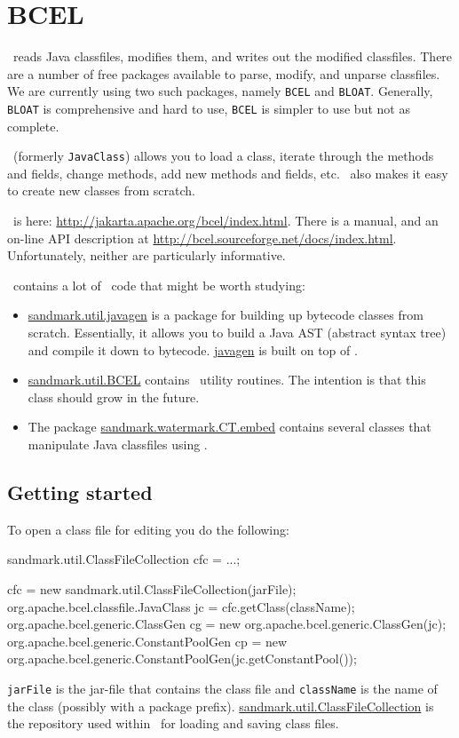 \section{BCEL}
\SM\ reads Java classfiles, modifies them, and
writes out the modified classfiles. There are
a number of free packages available to parse,
modify, and unparse classfiles. We are currently
using two such packages, namely {\tt BCEL} and
{\tt BLOAT}. Generally, {\tt BLOAT} is comprehensive
and hard to use, {\tt BCEL} is simpler to use but
not as complete.

\BCEL\ (formerly {\tt JavaClass}) allows you to load a class,
iterate through the methods and fields, change
methods, add new methods and fields, etc. \BCEL\
also makes it easy to create new classes from
scratch.

\BCEL\ is here:
\url{http://jakarta.apache.org/bcel/index.html}.
There is a manual, and an on-line API description
at \url{http://bcel.sourceforge.net/docs/index.html}.
Unfortunately, neither are particularly informative.

\SM\ contains a lot of \BCEL\ code that might be
worth studying:
\begin{itemize}
   \item \url{sandmark.util.javagen} is a package
         for building up bytecode classes from
         scratch. Essentially, it allows you to
         build a Java AST (abstract syntax tree)
         and compile it down to bytecode. \url{javagen}
         is built on top of \BCEL.
   \item \url{sandmark.util.BCEL} contains \BCEL\
         utility routines. The intention is that
         this class should grow in the future.
   \item The package \url{sandmark.watermark.CT.embed}
         contains several classes that manipulate 
         Java classfiles using \BCEL.
\end{itemize}

\subsection{Getting started}
To open a class file for editing you do the following:
\begin{listing}{1}
   sandmark.util.ClassFileCollection cfc = ...;

   cfc = new sandmark.util.ClassFileCollection(jarFile);
   org.apache.bcel.classfile.JavaClass jc = cfc.getClass(className);
   org.apache.bcel.generic.ClassGen cg = new org.apache.bcel.generic.ClassGen(jc);
   org.apache.bcel.generic.ConstantPoolGen cp = 
      new org.apache.bcel.generic.ConstantPoolGen(jc.getConstantPool());
\end{listing}
{\tt jarFile} is the jar-file that contains the class
file and {\tt className} is the name of the class
(possibly with a package prefix). 
\url{sandmark.util.ClassFileCollection} is the
repository used within \SM\ for loading and
saving class files.

